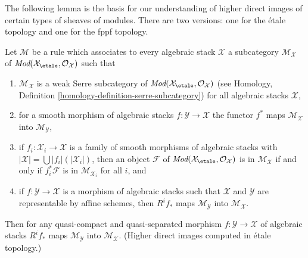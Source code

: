 \noindent
The following lemma is the basis for our understanding of
higher direct images of certain types of sheaves of modules.
There are two versions: one for the \'etale topology and
one for the fppf topology.

\begin{lemma}
\label{lemma-general-pushforward}
Let $\mathcal{M}$ be a rule which associates to every algebraic stack
$\mathcal{X}$ a subcategory $\mathcal{M}_\mathcal{X}$ of
$\textit{Mod}(\mathcal{X}_\etale, \mathcal{O}_\mathcal{X})$
such that
\begin{enumerate}
\item $\mathcal{M}_\mathcal{X}$ is a weak Serre subcategory
of $\textit{Mod}(\mathcal{X}_\etale, \mathcal{O}_\mathcal{X})$
(see Homology, Definition \ref{homology-definition-serre-subcategory})
for all algebraic stacks $\mathcal{X}$,
\item for a smooth morphism of algebraic stacks
$f : \mathcal{Y} \to \mathcal{X}$ the functor $f^*$ maps
$\mathcal{M}_\mathcal{X}$ into $\mathcal{M}_\mathcal{Y}$,
\item if $f_i : \mathcal{X}_i \to \mathcal{X}$ is a family of smooth
morphisms of algebraic stacks with
$|\mathcal{X}| = \bigcup |f_i|(|\mathcal{X}_i|)$, then an object
$\mathcal{F}$ of
$\textit{Mod}(\mathcal{X}_\etale, \mathcal{O}_\mathcal{X})$
is in $\mathcal{M}_\mathcal{X}$ if and only if
$f_i^*\mathcal{F}$ is in $\mathcal{M}_{\mathcal{X}_i}$ for all $i$, and
\item if $f : \mathcal{Y} \to \mathcal{X}$ is a morphism of algebraic
stacks such that $\mathcal{X}$ and $\mathcal{Y}$ are representable
by affine schemes, then $R^if_*$ maps $\mathcal{M}_\mathcal{Y}$
into $\mathcal{M}_\mathcal{X}$.
\end{enumerate}
Then for any quasi-compact and quasi-separated morphism 
$f : \mathcal{Y} \to \mathcal{X}$ of algebraic stacks
$R^if_*$ maps $\mathcal{M}_\mathcal{Y}$
into $\mathcal{M}_\mathcal{X}$. (Higher direct images computed in \'etale
topology.)
\end{lemma}


